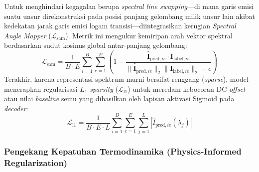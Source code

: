 Untuk menghindari kegagalan berupa \textit{spectral line swapping}—di mana garis emisi suatu unsur direkonstruksi pada posisi panjang gelombang milik unsur lain akibat kedekatan jarak garis emisi logam transisi—diintegrasikan kerugian \textit{Spectral Angle Mapper} ($\mathcal{L}_{\mathrm{sam}}$). Metrik ini mengukur kemiripan arah vektor spektral berdasarkan sudut kosinus global antar-panjang gelombang:
\begin{equation}
\mathcal{L}_{\mathrm{sam}} = \frac{1}{B \cdot E} \sum_{i=1}^{B} \sum_{e=1}^{E} \left( 1 - \frac{\hat{\mathbf{I}}_{\mathrm{pred}, ie} \cdot \mathbf{I}_{\mathrm{label}, ie}}{\|\hat{\mathbf{I}}_{\mathrm{pred}, ie}\|_2 \|\mathbf{I}_{\mathrm{label}, ie}\|_2 + \epsilon} \right)
\end{equation}
Terakhir, karena representasi spektrum murni bersifat renggang (\textit{sparse}), model menerapkan regularisasi $L_1$ \textit{sparsity} ($\mathcal{L}_{\mathrm{l1}}$) untuk meredam kebocoran DC \textit{offset} atau nilai \textit{baseline} semu yang dihasilkan oleh lapisan aktivasi Sigmoid pada \textit{decoder}:
\begin{equation}
\mathcal{L}_{\mathrm{l1}} = \frac{1}{B \cdot E \cdot L} \sum_{i=1}^{B} \sum_{e=1}^{E} \sum_{j=1}^{L} \left| \hat{I}_{\mathrm{pred}, ie}(\lambda_j) \right|
\end{equation}

\subsubsection{Pengekang Kepatuhan Termodinamika (Physics-Informed Regularization)}

